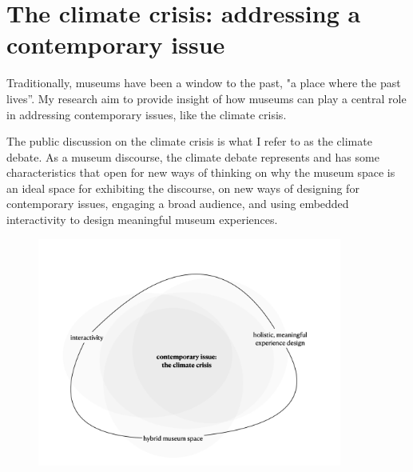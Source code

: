 \section{The climate crisis: addressing a contemporary issue}

Traditionally, museums have been a window to the past, "a place where the past lives”. My research aim to provide insight of how museums can play a central role in addressing contemporary issues, like the climate crisis.

The public discussion on the climate crisis is what I refer to as the climate debate. As a museum discourse, the climate debate represents and has some characteristics that open for new ways of thinking on why the museum space is an ideal space for exhibiting the discourse, on new ways of designing for contemporary issues, engaging a broad audience, and using embedded interactivity to design meaningful museum experiences.

\begin{figure}[h]
\includegraphics[width=10cm]{pictures/problem_sphere.png}
\centering 
\end{figure}

